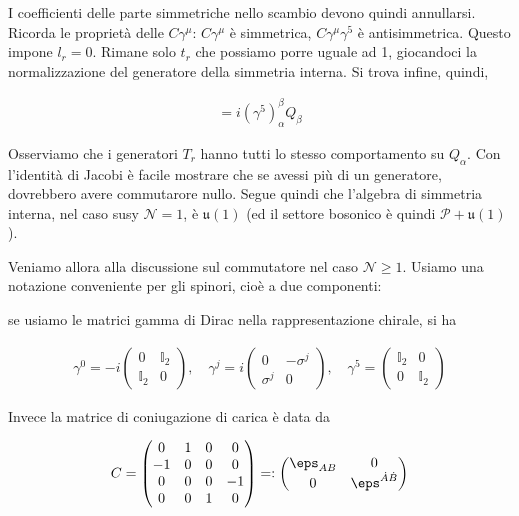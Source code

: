 \documentclass{report}
\begin{document}
I coefficienti delle parte simmetriche nello scambio devono quindi annullarsi. Ricorda le proprietà delle \(C\gamma^\mu\): \(C\gamma^\mu\) è simmetrica, \(C\gamma^\mu \gamma^5\) è antisimmetrica. Questo impone \(l_r = 0\). Rimane solo \(t_r\) che possiamo porre uguale ad 1, giocandoci la normalizzazione del generatore della simmetria interna. Si trova infine, quindi, 

\begin{align}
    [Q_\alpha, T_r] = i(\gamma^5)^\beta_\alpha Q_\beta
\end{align}

Osserviamo che i generatori \(T_r\) hanno tutti lo stesso comportamento su \(Q_\alpha\). Con l'identità di Jacobi è facile mostrare che se avessi più di un generatore, dovrebbero avere commutarore nullo. Segue quindi che l'algebra di simmetria interna, nel caso susy \(\mathcal{N} =1\), è \(\mathfrak{u}(1)\) (ed il settore bosonico è quindi \(\mathcal{P} + \mathfrak{u}(1)\)). 

Veniamo allora alla discussione sul commutatore nel caso \(\mathcal{N} \geq 1\). Usiamo una notazione conveniente per gli spinori, cioè a due componenti: 

se usiamo le matrici gamma di Dirac nella rappresentazione chirale, si ha 

\begin{align}
    \gamma^0 = -i\begin{pmatrix}
        0 & \mathbb{I}_2 \\ \mathbb{I}_2 & 0 
    \end{pmatrix}, \quad \gamma^j = i \begin{pmatrix}
        0 & -\sigma^j \\ \sigma^j & 0 
    \end{pmatrix}, \quad \gamma^5 = \begin{pmatrix}
        \mathbb{I}_2 & 0 \\ 0 & \mathbb{I}_2
    \end{pmatrix}
\end{align}

Invece la matrice di coniugazione di carica è data da 

\begin{align}
    C = \begin{pmatrix}
        0 & 1 & 0 & 0 \\ 
        -1 & 0 & 0 & 0 \\ 
        0 & 0 & 0 & -1 \\ 
        0 & 0 & 1 & 0 
    \end{pmatrix} =: \begin{pmatrix}
        \eps_{AB} & 0 \\ 
        0 & \eps^{\dot{A}\dot{B}}
    \end{pmatrix}
\end{align}
\end{document}
